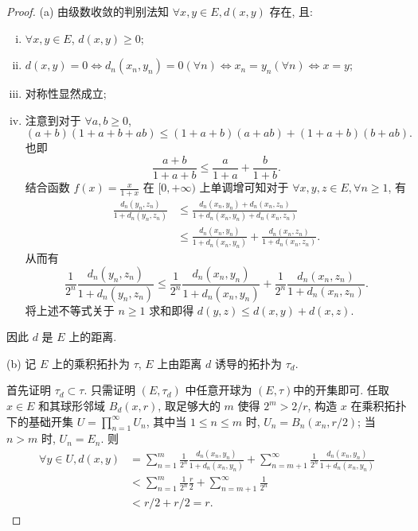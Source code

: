 \documentclass{mathexercise}
\begin{document}
\begin{proof}
    (a) 由级数收敛的判别法知 $\forall x,y\in E,d(x,y)$ 存在, 且:
    \begin{enumerate}[(i)]
    \item $\forall x,y\in E$, $d(x,y)\geq 0$;
    \item $d(x,y)=0\Leftrightarrow d_n(x_n,y_n)=0(\forall n)\Leftrightarrow x_n=y_n(\forall n)\Leftrightarrow x=y$;
    \item 对称性显然成立;
    \item 注意到对于 $\forall a,b\geq 0$,
    \[(a+b)(1+a+b+ab)\leq (1+a+b)(a+ab)+(1+a+b)(b+ab).\]
    也即
    \[\frac{a+b}{1+a+b}\leq\frac{a}{1+a}+\frac{b}{1+b}.\]
    结合函数 $f(x)=\frac{x}{1+x}$ 在 $[0,+\infty)$ 上单调增可知对于 $\forall x,y,z\in E,\forall n\geq 1$, 有
    \begin{align*}
        \frac{d_n(y_n,z_n)}{1+d_n(y_n,z_n)}&\leq\frac{d_n(x_n,y_n)+d_n(x_n,z_n)}{1+d_n(x_n,y_n)+d_n(x_n,z_n)} \\
                                           &\leq\frac{d_n(x_n,y_n)}{1+d_n(x_n,y_n)}+\frac{d_n(x_n,z_n)}{1+d_n(x_n,z_n)}.
    \end{align*}
    从而有
    \begin{equation*}
        \frac{1}{2^n}\frac{d_n(y_n,z_n)}{1+d_n(y_n,z_n)}\leq\frac{1}{2^n}\frac{d_n(x_n,y_n)}{1+d_n(x_n,y_n)}+\frac{1}{2^n}\frac{d_n(x_n,z_n)}{1+d_n(x_n,z_n)}.
    \end{equation*}
    将上述不等式关于 $n\geq 1$ 求和即得 $d(y,z)\leq d(x,y)+d(x,z)$.
    \end{enumerate}
    因此 $d$ 是 $E$ 上的距离.
    
    (b) 记 $E$ 上的乘积拓扑为 $\tau$, $E$ 上由距离 $d$ 诱导的拓扑为 $\tau_d$.
    
    首先证明 $\tau_d\subset\tau$. 只需证明 $(E,\tau_d)$ 中任意开球为 $(E,\tau)$中的开集即可. 
    任取 $x\in E$ 和其球形邻域 $B_d(x,r)$, 取足够大的 $m$ 使得 $2^m>2/r$,
    构造 $x$ 在乘积拓扑下的基础开集 $U=\prod_{n=1}^\infty U_n$, 其中当 $1\leq n\leq m$ 时, $U_n=B_n(x_n,r/2)$;
    当 $n>m$ 时, $U_n=E_n$. 则
    \begin{align*}
        \forall y\in U,d(x,y)&=\sum_{n=1}^m\frac{1}{2^n}\frac{d_n(x_n,y_n)}{1+d_n(x_n,y_n)}+\sum_{n=m+1}^\infty\frac{1}{2^n}\frac{d_n(x_n,y_n)}{1+d_n(x_n,y_n)}\\
        &<\sum_{n=1}^m\frac{1}{2^n}\frac{r}{2}+\sum_{n=m+1}^\infty\frac{1}{2^n}\\
        &<r/2+r/2=r.
    \end{align*}
    

\end{proof}
\end{document}
